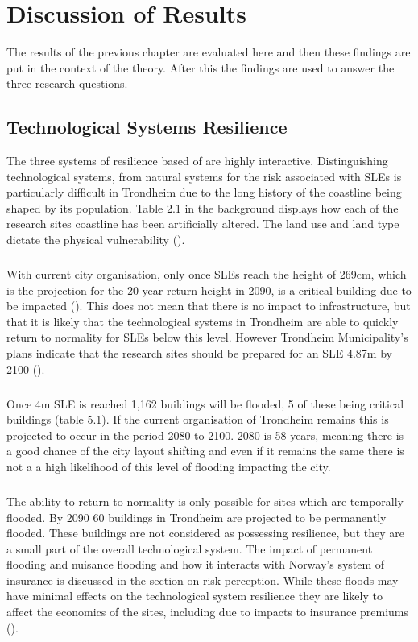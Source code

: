 

\chapter{Discussion of Results}
The results of the previous chapter are evaluated here and then these findings are put in the context of the theory. After this the findings are used to answer the three research questions. 



\section{Technological Systems Resilience}
The three systems of resilience based of \cite{cutter_place-based_2008} are highly interactive. Distinguishing technological systems, from natural systems for the risk associated with SLEs is particularly difficult in Trondheim due to the long history of the coastline being shaped by its population. Table 2.1 in the background  displays how each of the research sites coastline has been artificially altered. The land use and land type dictate the physical vulnerability (\cite{opach_seeking_2020}).
\paragraph{}

With current city organisation, only once SLEs reach the height of 269cm, which is the projection for the 20 year return height in 2090, is a critical building due to be impacted (\cite{kartverket_se_2020}). This does not mean that there is no impact to infrastructure, but that it is likely that the technological systems in Trondheim are able to quickly return to normality for SLEs below this level. However Trondheim Municipality's plans indicate that the research sites should be prepared for an SLE 4.87m by 2100 (\cite{hanssen_saksframlegg_2013}).
\paragraph{}
Once 4m SLE is reached 1,162 buildings will be flooded, 5 of these being critical buildings (table 5.1). If the current organisation of Trondheim remains this is projected to occur in the period 2080 to 2100. 2080 is 58 years, meaning there is a good chance of the city layout shifting and even if it remains the same there is not a a high likelihood of this level of flooding impacting the city.  
\paragraph{}
The ability to return to normality is only possible for sites which are temporally flooded. By 2090 60 buildings in Trondheim are projected to be permanently flooded. These buildings are not considered as possessing resilience, but they are a small part of the overall technological system. The impact of permanent flooding and nuisance flooding and how it interacts with Norway's system of insurance is discussed in the section on risk perception. While these floods may have minimal effects on the technological system resilience they are likely to affect the economics of the sites, including due to impacts to insurance premiums (\cite{cutter_community_2020}). 
